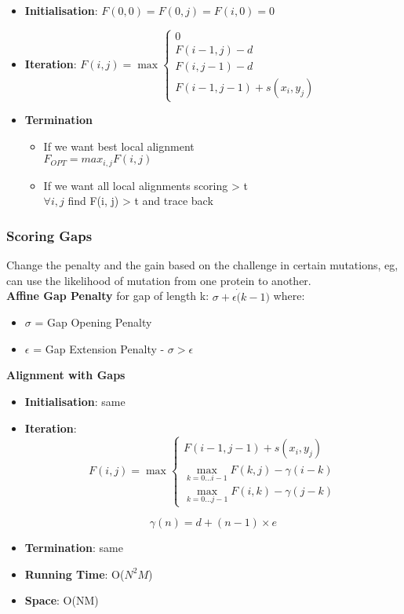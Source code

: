 \documentclass{article}
\begin{document}
\begin{itemize}
    \item \textbf{Initialisation}: $F(0, 0) = F(0, j) = F(i, 0) = 0$
    \item \textbf{Iteration}: $
F(i, j)=\max \left\{\begin{array}{l}{0} \\ {F(i-1, j)-d} \\ {F(i, j-1)-d} \\ {F(i-1, j-1)+s\left(x_{i}, y_{j}\right)}\end{array}\right.
$

    \item \textbf{Termination}
    \begin{itemize}
        \item If we want best local alignment\\
        $F_{OPT} = max_{i, j}F(i, j)$
        
        \item If we want all local alignments scoring > t \\
        $\forall i, j$ find F(i, j) > t and trace back
    \end{itemize}
\end{itemize}

\subsubsection{Scoring Gaps}
Change the penalty and the gain based on the challenge in certain mutations, eg, can use the likelihood of mutation from one protein to another.\\

\noindent \textbf{Affine Gap Penalty} for gap of length k: $\sigma + \epsilon \dot (k-1)$ where:
\begin{itemize}
    \item $\sigma$ = Gap Opening Penalty
    \item $\epsilon$ = Gap Extension Penalty - $\sigma > \epsilon$
\end{itemize}

\textbf{Alignment with Gaps}
\begin{itemize}
    \item \textbf{Initialisation}: same
    \item \textbf{Iteration}: $$
F(i, j)=\max \left\{\begin{array}{l}{F(i-1, j-1)+s\left(x_{i}, y_{j}\right)} \\ {\max _{k=0 \ldots i-1} F(k, j)-\gamma(i-k)} \\ {\max _{k=0 \ldots j-1} F(i, k)-\gamma(j-k)}\end{array}\right.
$$

    
    \subitem $$\gamma (n) = d + (n-1) \times e$$
    \item \textbf{Termination}: same
    \item \textbf{Running Time}: O($N^{2}M$)
    \item \textbf{Space}: O(NM)
    
\end{itemize}
\end{document}
